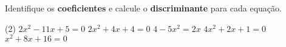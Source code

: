 \begin{question} %
    Identifique os \textbf{coeficientes} e calcule o \textbf{discriminante} para cada equação.
\begin{tasks}(2)
        \task $2x^2-11x+5=0$
        \task $2x^2+4x+4=0$
        \task $4-5x^2=2x$
        \task $4x^2+2x+1=0$
        \task $x^2+8x+16=0$
    \end{tasks}
\end{question}
